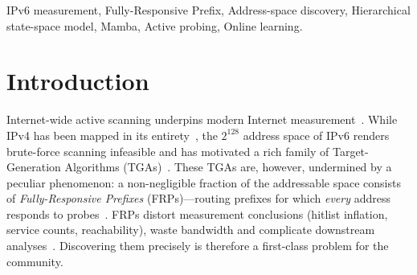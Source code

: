 \documentclass[conference]{IEEEtran}
\begin{document}
\begin{IEEEkeywords}
IPv6 measurement, Fully-Responsive Prefix, Address-space discovery,
Hierarchical state-space model, Mamba, Active probing, Online
learning.
\end{IEEEkeywords}


\section{Introduction}\label{sec:intro}

Internet-wide active scanning underpins modern Internet
measurement~\cite{durumeric2013zmap,durumeric2013zmap-ext,rye2023ipv6hitlist,foremski2016entropy,pour2020comprehensive}.
While IPv4 has been mapped in its
entirety~\cite{durumeric2013zmap,zgrab2}, the $2^{128}$ address space of IPv6
renders brute-force scanning infeasible and has motivated a rich
family of Target-Generation Algorithms
(TGAs)~\cite{song2022det,yang20226forest,hou20216hit,song2020hitlist,zhang20246vision,song20206gcvae,song20216veclm,song20216gan,yang20226graph,liu20166tree,zhou20236tree-ml,liu2018build-hitlist}.
These TGAs are, however, undermined by a peculiar phenomenon: a
non-negligible fraction of the addressable space consists of
\emph{Fully-Responsive Prefixes} (FRPs)---routing prefixes for which
\emph{every} address responds to
probes~\cite{gasser2018clusters,zirngibl2022rusty,sattler2023hrp,cheng2024luori,cheng2024seed-selection,plonka2015temporal}.
FRPs distort measurement conclusions (hitlist inflation, service
counts, reachability), waste bandwidth and complicate downstream
analyses~\cite{erdemir2025aliases}.  Discovering them precisely is
therefore a first-class problem for the community.
\end{document}
